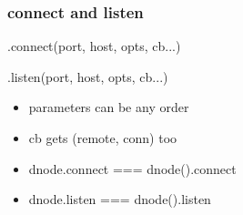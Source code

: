 \documentclass{beamer}
\begin{document}
\begin{frame}
    \frametitle{connect and listen}
    \large
    
    .connect(port, host, opts, cb...)
    
    .listen(port, host, opts, cb...)
    
    \begin{itemize}
    \item parameters can be any order
    \pause
    \item cb gets (remote, conn) too
    \pause
    \item dnode.connect === dnode({}).connect
    \item dnode.listen === dnode({}).listen
    \end{itemize}
\end{frame}
\end{document}
